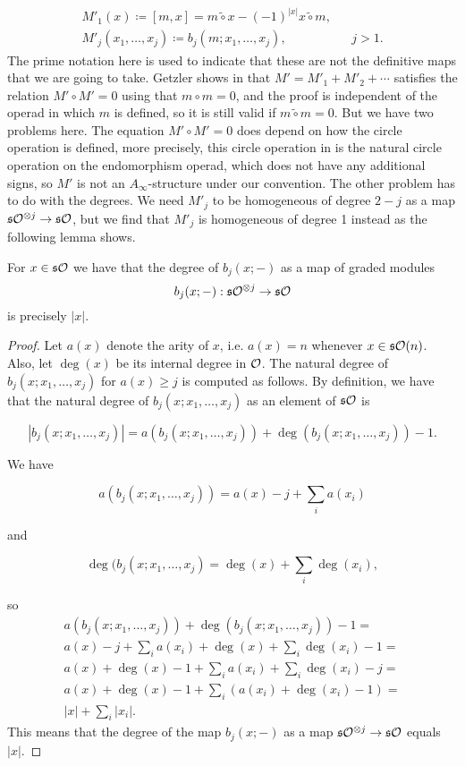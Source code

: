 \documentclass[Thesis.tex]{subfiles}
\begin{document}
\begin{align*}
M'_1(x)\coloneqq [m,x]=m\tilde{\circ} x-(-1)^{|x|}x\tilde{\circ}m, & &  \\
M'_j(x_1,\dots, x_j)\coloneqq b_j(m;x_1,\dots, x_j),& &j>1.
\end{align*}
The prime notation here is used to indicate that these are not the definitive maps that we are going to take. Getzler shows in \cite{getzler} that $M'=M'_1+M'_2+\cdots$ satisfies the relation $M'\circ M'=0$ using that $m\circ m=0$, and the proof is independent of the operad in which $m$ is defined, so it is still valid if $m\tilde{\circ}m=0$. But we have two problems here. The equation $M'\circ M'=0$ does depend on how the circle operation is defined, more precisely, this circle operation in \cite{getzler} is the natural circle operation on the endomorphism operad, which does not have any additional signs, so $M'$ is not an $A_\infty$-structure under our convention. The other problem has to do with the degrees. We need $M'_j$ to be homogeneous of degree $2-j$ as a map $\mathfrak{s}{\mathcal O}^{\otimes j}\to \mathfrak{s}{\mathcal O}$, but we find that $M'_j$ is homogeneous of degree 1 instead as the following lemma shows.
\begin{lem}\label{lemmadegree}
For $x\in\mathfrak{s}{\mathcal O}$ we have that  the degree of $b_j(x;-)$ as a map of graded modules \[b_j(x;-):\mathfrak{s}{\mathcal O}^{\otimes j}\to\mathfrak{s}{\mathcal O}\] is precisely $|x|$.
\end{lem}
\begin{proof}
Let $a(x)$ denote the arity of $x$, i.e. $a(x)=n$ whenever $x\in\mathfrak{s}{\mathcal O}(n)$. Also, let $\deg(x)$ be its internal degree in ${\mathcal O}$. The natural degree of $b_j(x;x_1,\dots,x_j)$ for $a(x)\geq j$ is computed as follows. By definition, we have that the natural degree of $b_j(x;x_1,\dots,x_j)$ as an element of $\mathfrak{s}{\mathcal O}$ is

\[|b_j(x;x_1,\dots,x_j)|=a(b_j(x;x_1,\dots,x_j))+\deg(b_j(x;x_1,\dots,x_j))-1.\]

We have 

\[a(b_j(x;x_1,\dots,x_j))=a(x)-j+\sum_i a(x_i)\]

and 

\[\deg(b_j(x;x_1,\dots,x_j)=\deg(x)+\sum_i\deg(x_i),\]

so 
\begin{align*}
a(b_j(x;x_1,\dots,x_j))+\deg(b_j(x;x_1,\dots,x_j))-1=\\
a(x)-j+\sum_i a(x_i)+\deg(x)+\sum_i\deg(x_i)-1=\\
a(x)+\deg(x)-1+\sum_i a(x_i)+\sum_i\deg(x_i)-j=\\
a(x)+\deg(x)-1+\sum_i (a(x_i)+\deg(x_i)-1)=\\
|x|+\sum_i|x_i|.
\end{align*}
This means that the degree of the map $b_j(x;-)$ as a map $\mathfrak{s}{\mathcal O}^{\otimes j}\to \mathfrak{s}{\mathcal O}$ equals $|x|$.

\end{proof} %
\end{document}
